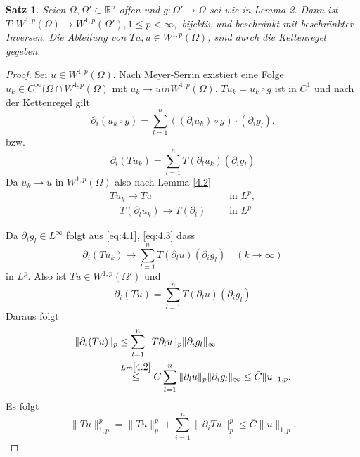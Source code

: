 \documentclass[
paper=a4,
bibtotocnumbered,
liststotocnumbered,
tablecaptionabove,
pointlessnumbers,
twoside,
openright,
10pt
]
{report}
\newtheorem{satz}[thm]{Satz}
\theoremstyle{definition}
\numberwithin{equation}{chapter}
\begin{document}
\begin{satz}
 Seien $\Omega, \Omega'\subset \mathbb R^n$ offen und $g: \Omega'\to \Omega$ sei wie in Lemma 2. 
 Dann ist $T: W^{1,p}(\Omega) \to W^{1,p}(\Omega'), 1\le p <\infty,$ bijektiv und beschränkt mit 
 beschränkter Inversen. Die Ableitung von $Tu, u \in W^{1,p}(\Omega)$, sind durch die Kettenregel gegeben.
\end{satz}
\begin{proof}
 Sei $u\in W^{1,p}(\Omega)$. Nach Meyer-Serrin existiert eine Folge $u_k \in C^\infty(\Omega \cap W^{1,p}(\Omega)$ mit $u_k \to u in W^{1,p}(\Omega)$. 
 $Tu_k=u_k \circ g$ ist in $C^1$ und nach der Kettenregel gilt
 \begin{equation}
  \partial_i (u_k \circ g) = \sum_{l=1}^n ((\partial_l u_k)\circ g)\cdot(\partial_i g_l).
 \end{equation}
 bzw.
 \begin{equation}\label{eq:4.1}
  \partial_i (Tu_k) = \sum_{l=1}^n T(\partial_l u_k) (\partial_i g_l)
 \end{equation}
Da $u_k \to u$ in $W^{1,p}(\Omega)$ also nach Lemma \eqref{4.2}
\begin{align}
 T u_k \to Tu &\ \quad \text{ in } L^p, \label{eq:4.2} \\ \quad T(\partial_l u_k) \to T(\partial_l) &\ \quad \text{ in } L^p \label{eq:4.3}
\end{align}

Da $\partial_i g_l \in L^\infty$ folgt aus \eqref{eq:4.1}, \eqref{eq:4.3} dass
\begin{equation}
 \partial_i(Tu_k) \to \sum_{l=1}^n T(\partial_l u) ( \partial_i g_l) \quad ( k\to \infty)
\end{equation}
in $L^p$. Also ist $Tu\in W^{1,p}(\Omega')$ und 
\begin{equation}
 \partial_i(Tu) = \sum_{l=1}^n T(\partial_l u) (\partial_i g_l)
\end{equation}
Daraus folgt
\begin{align*}
 \|\partial_i(Tu)\|_p &\le \sum_{l=1}^n \|T\partial_l u \|_p \| \partial_i g_l\|_\infty\\
 &\stackrel{Lm \ref{4.2}}\le C \sum_{l=1}^n \| \partial_l u\|_p \| \partial_i g_l\|_\infty \le \tilde C \|u\|_{1,p}.
\end{align*}
Es folgt
\begin{equation}
 \|Tu\|_{1,p}^p = \|Tu\|_p^p + \sum_{i=1}^n \| \partial_i Tu\|_p^p \le \overline C \|u\|_{1,p}.
\end{equation}
\end{proof}
\end{document}

